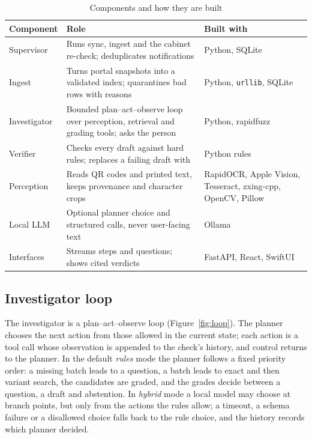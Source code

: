\begin{table}[t]
\centering
\caption{Components and how they are built}
\label{tab:components}
\scriptsize
\begin{tabularx}{\columnwidth}{@{}>{\raggedright\arraybackslash}p{15mm} X >{\raggedright\arraybackslash}p{19mm}@{}}
\toprule
Component & Role & Built with \\
\midrule
Supervisor & Runs sync, ingest and the cabinet re-check; deduplicates notifications & Python, SQLite \\
Ingest & Turns portal snapshots into a validated index; quarantines bad rows with reasons & Python, \texttt{urllib}, SQLite \\
Investigator & Bounded plan--act--observe loop over perception, retrieval and grading tools; asks the person & Python, rapidfuzz \\
Verifier & Checks every draft against hard rules; replaces a failing draft with \CANTV{} & Python rules \\
Perception & Reads QR codes and printed text, keeps provenance and character crops & RapidOCR, Apple Vision, Tesseract, zxing-cpp, OpenCV, Pillow \\
Local LLM & Optional planner choice and structured calls, never user-facing text & Ollama \cite{ollama2026structured} \\
Interfaces & Streams steps and questions; shows cited verdicts & FastAPI, React, SwiftUI \\
\bottomrule
\end{tabularx}
\end{table}

\subsection{Investigator loop}
The investigator is a plan--act--observe loop (Figure~\ref{fig:loop}). The planner chooses the next action from those allowed in the current state; each action is a tool call whose observation is appended to the check's history, and control returns to the planner. In the default \emph{rules} mode the planner follows a fixed priority order: a missing batch leads to a question, a batch leads to exact and then variant search, the candidates are graded, and the grades decide between a question, a draft and abstention. In \emph{hybrid} mode a local model may choose at branch points, but only from the actions the rules allow; a timeout, a schema failure or a disallowed choice falls back to the rule choice, and the history records which planner decided.

